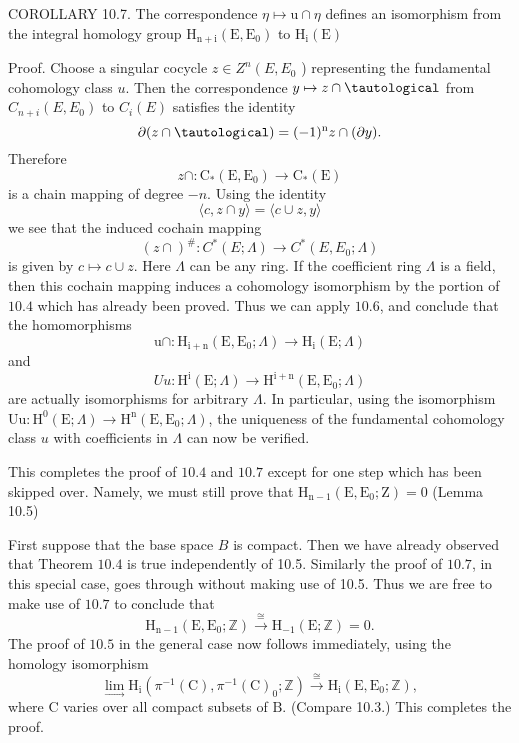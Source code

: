 \documentclass[10pt]{article}
\begin{document}
COROLLARY 10.7. The correspondence $\eta \mapsto \mathrm{u} \cap \eta$ defines an isomorphism from the integral homology group $\mathrm{H}_{\mathrm{n}+\mathrm{i}}\left(\mathrm{E}, \mathrm{E}_{0}\right)$ to $\mathrm{H}_{\mathrm{i}}(\mathrm{E})$

Proof. Choose a singular cocycle $z \in Z^{n}\left(E, E_{0}\right.$ ) representing the fundamental cohomology class $u$. Then the correspondence $y \mapsto z \cap \tautological$ from $C_{n+i}\left(E, E_{0}\right)$ to $C_{i}(E)$ satisfies the identity
$$
\partial(z \cap \tautological)=(-1)^{\mathrm{n}} z \cap(\partial y) .
$$
Therefore
$$
z \cap: \mathrm{C}_{*}\left(\mathrm{E}, \mathrm{E}_{0}\right) \rightarrow \mathrm{C}_{*}(\mathrm{E})
$$
is a chain mapping of degree $-n$. Using the identity
$$
\langle c, z \cap y\rangle=\langle c \cup z, y\rangle
$$
we see that the induced cochain mapping
$$
(z \cap)^{\#}: C^{*}(E ; \Lambda) \rightarrow C^{*}\left(E, E_{0} ; \Lambda\right)
$$
is given by $c \mapsto c \cup z$. Here $\Lambda$ can be any ring. If the coefficient ring $\Lambda$ is a field, then this cochain mapping induces a cohomology isomorphism by the portion of $10.4$ which has already been proved. Thus we can apply $10.6$, and conclude that the homomorphisms
$$
\mathrm{u} \cap: \mathrm{H}_{\mathrm{i}+\mathrm{n}}\left(\mathrm{E}, \mathrm{E}_{0} ; \Lambda\right) \rightarrow \mathrm{H}_{\mathrm{i}}(\mathrm{E} ; \Lambda)
$$
and
$$
U u: \mathrm{H}^{\mathrm{i}}(\mathrm{E} ; \Lambda) \rightarrow \mathrm{H}^{\mathrm{i}+\mathrm{n}}\left(\mathrm{E}, \mathrm{E}_{0} ; \Lambda\right)
$$
are actually isomorphisms for arbitrary $\Lambda$. In particular, using the isomorphism $\mathrm{Uu}: \mathrm{H}^{0}(\mathrm{E} ; \Lambda) \rightarrow \mathrm{H}^{\mathrm{n}}\left(\mathrm{E}, \mathrm{E}_{0} ; \Lambda\right)$, the uniqueness of the fundamental cohomology class $u$ with coefficients in $\Lambda$ can now be verified.

This completes the proof of $10.4$ and $10.7$ except for one step which has been skipped over. Namely, we must still prove that $\mathrm{H}_{\mathrm{n}-1}\left(\mathrm{E}, \mathrm{E}_{0} ; \mathrm{Z}\right)=0$ (Lemma 10.5)

First suppose that the base space $B$ is compact. Then we have already observed that Theorem $10.4$ is true independently of 10.5. Similarly the proof of $10.7$, in this special case, goes through without making use of 10.5. Thus we are free to make use of $10.7$ to conclude that
$$
\mathrm{H}_{\mathrm{n}-1}\left(\mathrm{E}, \mathrm{E}_{0} ; \mathbb{Z}\right) \stackrel{\cong}{\longrightarrow} \mathrm{H}_{-1}(\mathrm{E} ; \mathbb{Z})=0 .
$$
The proof of $10.5$ in the general case now follows immediately, using the homology isomorphism
$$
\lim _{\rightarrow} \mathrm{H}_{\mathrm{i}}\left(\pi^{-1}(\mathrm{C}), \pi^{-1}(\mathrm{C})_{0} ; \mathbb{Z}\right) \stackrel{\cong}{\longrightarrow} \mathrm{H}_{\mathrm{i}}\left(\mathrm{E}, \mathrm{E}_{0} ; \mathbb{Z}\right),
$$
where $\mathrm{C}$ varies over all compact subsets of $\mathrm{B}$. (Compare 10.3.) This completes the proof.
\end{document}
